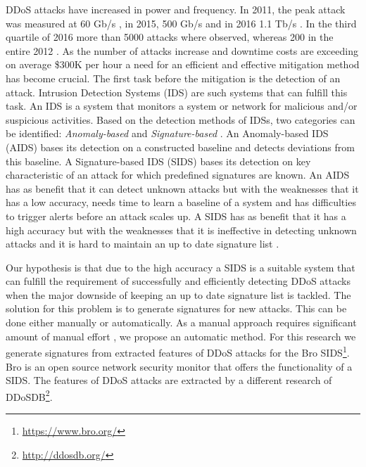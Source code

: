 DDoS attacks have increased in power and frequency. In 2011, the peak attack was measured at 60 Gb/s \cite{Arbor2014}, in 2015, 500 Gb/s and in 2016 1.1 Tb/s \cite{Akamai2017}. In the third quartile of 2016 more than 5000 attacks where observed, whereas 200 in the entire 2012 \cite{Akamai2016}. As the number of attacks increase and downtime costs are exceeding on average \$300K per hour \cite{ITIC2016} a need for an efficient and effective mitigation method has become crucial. The first task before the mitigation is the detection of an attack. Intrusion Detection Systems (IDS) are such systems that can fulfill this task. An IDS is a system that monitors a system or network for malicious and/or suspicious activities. 
Based on the detection methods of IDSs, two categories can be identified: \textit{Anomaly-based} and \textit{Signature-based} \cite{fragkiadakis2015anomaly}. An Anomaly-based IDS (AIDS) bases its detection on a constructed baseline and detects deviations from this baseline. A Signature-based IDS (SIDS) bases its detection on key characteristic of an attack for which predefined signatures are known. An AIDS has as benefit that it can detect unknown attacks but with the weaknesses that it has a low accuracy, needs time to learn a baseline of a system and has difficulties to trigger alerts before an attack scales up. A SIDS has as benefit that it has a high accuracy but with the weaknesses that it is ineffective in detecting unknown attacks and it is hard to maintain an up to date signature list \cite{Liao2013}. 

Our hypothesis is that due to the high accuracy a SIDS is a suitable system that can fulfill the requirement of successfully and efficiently detecting DDoS attacks when the major downside of keeping an up to date signature list is tackled. The solution for this problem is to generate signatures for new attacks. This can be done either manually or automatically. As a manual approach requires significant amount of manual effort \cite{Lin2013}, we propose an automatic method. For this research we generate signatures from extracted features of DDoS attacks for the Bro SIDS\footnote{\url{https://www.bro.org/}}. Bro is an open source network security monitor that offers the functionality of a SIDS. The features of DDoS attacks are extracted by a different research of DDoSDB\footnote{\url{http://ddosdb.org/}}.


